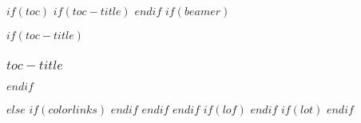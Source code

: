 
% 
% 
% 
% 

$if(toc)$
$if(toc-title)$
\renewcommand*\contentsname{$toc-title$}
$endif$
$if(beamer)$
\begin{frame}[allowframebreaks]
$if(toc-title)$
  \frametitle{$toc-title$}
$endif$
  \tableofcontents[hideallsubsections]
\end{frame}
$else$
{
$if(colorlinks)$
\hypersetup{linkcolor=$if(toccolor)$$toccolor$$else$$endif$}
$endif$
\setcounter{tocdepth}{$toc-depth$}
}
$endif$
$endif$
$if(lof)$
$endif$
$if(lot)$
$endif$